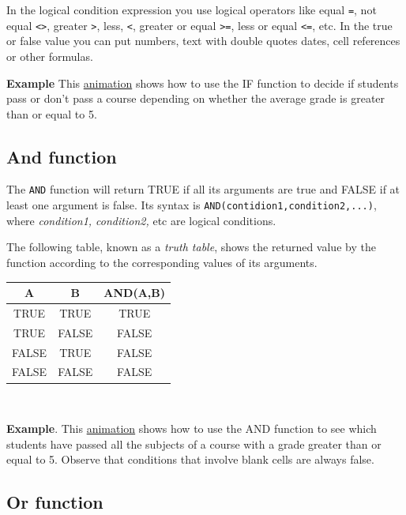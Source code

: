 In the logical condition expression you use logical operators like equal \texttt{=}, not equal \texttt{\textless{}\textgreater{}}, greater \texttt{\textgreater{}}, less, \texttt{\textless{}}, greater or equal \texttt{\textgreater{}=}, less or equal \texttt{\textless{}=}, etc. In the true or false value you can put numbers, text with double quotes dates, cell references or other formulas.

\textbf{Example} This \href{http://aprendeconalf.es/office/excel/manual/img/example_function_if.gif}{animation} shows how to use the IF function to decide if students pass or don't pass a course depending on whether the average grade is greater than or equal to 5.

\subsection{And function}\hypertarget{and-function}{}\label{and-function}

The \texttt{AND} function will return TRUE if all its arguments are true and FALSE if at least one argument is false. Its syntax is \texttt{AND(contidion1,condition2,...)}, where \emph{condition1, condition2,} etc are logical conditions.

The following table, known as a \emph{truth table}, shows the returned value by the function according to the corresponding values of its arguments.

\begin{longtable}{|c|c|c|}
\hline
A & B & AND(A,B)\\
\hline
TRUE & TRUE & TRUE\\
TRUE & FALSE & FALSE\\
FALSE & TRUE & FALSE\\
FALSE & FALSE & FALSE\\
\hline
\end{longtable}

~{}

\textbf{Example}. This \href{http://aprendeconalf.es/office/excel/manual/img/example_function_and.gif}{animation} shows how to use the AND function to see which students have passed all the subjects of a course with a grade greater than or equal to 5. Observe that conditions that involve blank cells are always false.

\subsection{Or function}\hypertarget{or-function}{}\label{or-function}

